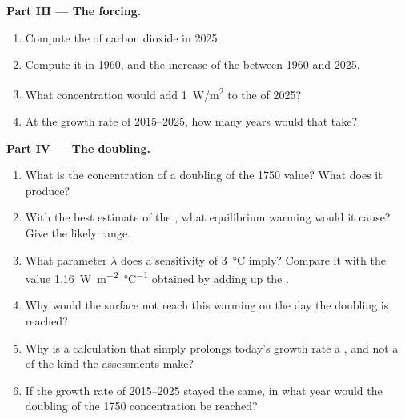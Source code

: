 \begin{problem}
\medskip
\noindent\textbf{Part III --- The forcing.}
\begin{enumerate}[resume]
  \item Compute the  of carbon dioxide in 2025.
  \item Compute it in 1960, and the increase of the  between 1960
        and 2025.
  \item What concentration would add \qty{1}{W/m^2} to the  of 2025?
  \item At the growth rate of 2015--2025, how many years would that take?
\end{enumerate}

\medskip
\noindent\textbf{Part IV --- The doubling.}
\begin{enumerate}[resume]
  \item What is the concentration of a doubling of the 1750 value? What
         does it produce?
  \item With the best estimate of the ,
        what equilibrium warming would it cause? Give the likely range.
  \item What  parameter $\lambda$ does a sensitivity of
        \qty{3}{\degreeCelsius} imply? Compare it with the value
        \qty{1.16}{W.m^{-2}.\degreeCelsius^{-1}} obtained by adding up the
        .
  \item Why would the surface not reach this warming on the day the
        doubling is reached?
  \item Why is a calculation that simply prolongs today's growth rate a
        , and not a  of the kind the assessments make?
  \item If the growth rate of 2015--2025 stayed the same, in what year
        would the doubling of the 1750 concentration be reached?
\end{enumerate}
\end{problem}
